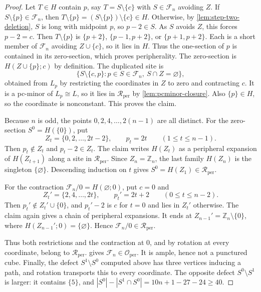 \documentclass[11pt]{article}
\theoremstyle{definition}
\theoremstyle{remark}
\newcommand{\Rper}{\mathcal R_{\mathrm{per}}}
\newcommand{\Oper}{\mathcal O_{\mathrm{per}}}
\begin{document}
\begin{proof}
Let \(T\in H\) contain \(p\), say \(T=S\setminus\{c\}\) with
\(S\in\mathcal F_n\) avoiding \(Z\).  If \(S\setminus\{p\}\in\mathcal F_n\),
then \(T\setminus\{p\}=(S\setminus\{p\})\setminus\{c\}\in H\).  Otherwise,
by \cref{lem:step-two-deletion}, \(S\) is long with midpoint \(p\), so
\(p-2\in S\).  As \(S\) avoids \(Z\), this forces \(p-2=c\).  Then
\(T\setminus\{p\}\) is \(\{p+2\}\), \(\{p-1,p+2\}\), or
\(\{p+1,p+2\}\).  Each is a short member of \(\mathcal F_n\) avoiding
\(Z\cup\{c\}\), so it lies in \(H\).  Thus the one-section of \(p\) is
contained in its zero-section, which proves peripherality.  The
zero-section is \(H(Z\cup\{p\};c)\) by definition.  The duplicated site is
\[
 \{S\setminus\{c,p\}:p\in S\in\mathcal F_n,\ S\cap Z=\varnothing\},
\]
obtained from \(L_p\) by restricting the coordinates in \(Z\) to zero and
contracting \(c\).  It is a pc-minor of \(L_p\cong L\), so it lies in
\(\Rper\) by \cref{lem:pcminor-closure}.  Also \(\{p\}\in H\), so the
coordinate is nonconstant.  This proves the claim.

Because \(n\) is odd, the points \(0,2,4,\ldots,2(n-1)\) are all distinct.
For the zero-section \(S^0=H(\{0\})\), put
\[
 Z_t=\{0,2,\ldots,2t-2\},\qquad p_t=2t\qquad(1\le t\le n-1).
\]
Then \(p_t\notin Z_t\) and \(p_t-2\in Z_t\).  The claim writes
\(H(Z_t)\) as a peripheral expansion of \(H(Z_{t+1})\) along a site in
\(\Rper\).  Since \(Z_n=\mathbb Z_n\), the last family \(H(Z_n)\) is the
singleton \(\{\varnothing\}\).  Descending induction on \(t\) gives
\(S^0=H(Z_1)\in\Rper\).

For the contraction \(\mathcal F_n/0=H(\varnothing;0)\), put \(c=0\) and
\[
 Z_t'=\{2,4,\ldots,2t\},\qquad p_t'=2t+2\qquad(0\le t\le n-2).
\]
Then \(p_t'\notin Z_t'\cup\{0\}\), and \(p_t'-2\) is \(c\) for \(t=0\) and
lies in \(Z_t'\) otherwise.  The claim again gives a chain of peripheral
expansions.  It ends at \(Z_{n-1}'=\mathbb Z_n\setminus\{0\}\), where
\(H(Z_{n-1}';0)=\{\varnothing\}\).  Hence \(\mathcal F_n/0\in\Rper\).

Thus both restrictions and the contraction at \(0\), and by rotation at every
coordinate, belong to \(\Rper\).   gives
\(\mathcal F_n\in\Oper\).  It is ample, hence not a punctured cube.
Finally, the defect \(S^1\setminus S^0\) computed above has three
vertices inducing a path, and rotation transports this to every
coordinate.  The opposite defect \(S^0\setminus S^1\) is larger: it contains
\(\{5\}\), and \(|S^0|-|S^1\cap S^0|=10n+1-27-24\ge40\).
\end{proof}
\end{document}
